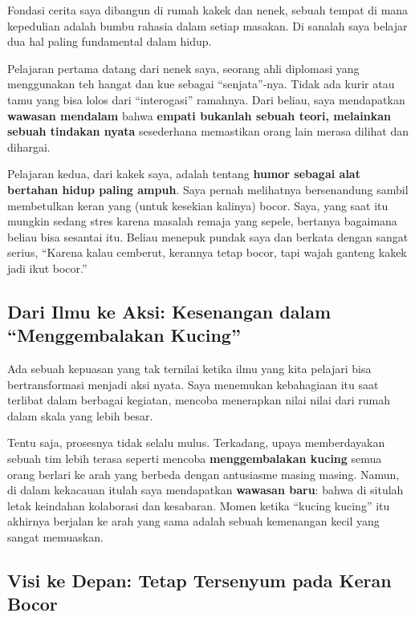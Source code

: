 \documentclass[
  letterpaper,
  DIV=11,
  numbers=noendperiod]{scrreprt}
\begin{document}
Fondasi cerita saya dibangun di rumah kakek dan nenek, sebuah tempat di
mana kepedulian adalah bumbu rahasia dalam setiap masakan. Di sanalah
saya belajar dua hal paling fundamental dalam hidup.

Pelajaran pertama datang dari nenek saya, seorang ahli diplomasi yang
menggunakan teh hangat dan kue sebagai ``senjata''-nya. Tidak ada kurir
atau tamu yang bisa lolos dari ``interogasi'' ramahnya. Dari beliau,
saya mendapatkan \textbf{wawasan mendalam} bahwa \textbf{empati bukanlah
sebuah teori, melainkan sebuah tindakan nyata} sesederhana memastikan
orang lain merasa dilihat dan dihargai.

Pelajaran kedua, dari kakek saya, adalah tentang \textbf{humor sebagai
alat bertahan hidup paling ampuh}. Saya pernah melihatnya bersenandung
sambil membetulkan keran yang (untuk kesekian kalinya) bocor. Saya, yang
saat itu mungkin sedang stres karena masalah remaja yang sepele,
bertanya bagaimana beliau bisa sesantai itu. Beliau menepuk pundak saya
dan berkata dengan sangat serius, ``Karena kalau cemberut, kerannya
tetap bocor, tapi wajah ganteng kakek jadi ikut bocor.''

\subsection{Dari Ilmu ke Aksi: Kesenangan dalam ``Menggembalakan
Kucing''}\label{dari-ilmu-ke-aksi-kesenangan-dalam-menggembalakan-kucing}

Ada sebuah kepuasan yang tak ternilai ketika ilmu yang kita pelajari
bisa bertransformasi menjadi aksi nyata. Saya menemukan kebahagiaan itu
saat terlibat dalam berbagai kegiatan, mencoba menerapkan nilai nilai
dari rumah dalam skala yang lebih besar.

Tentu saja, prosesnya tidak selalu mulus. Terkadang, upaya memberdayakan
sebuah tim lebih terasa seperti mencoba \textbf{menggembalakan kucing}
semua orang berlari ke arah yang berbeda dengan antusiasme masing
masing. Namun, di dalam kekacauan itulah saya mendapatkan
\textbf{wawasan baru}: bahwa di situlah letak keindahan kolaborasi dan
kesabaran. Momen ketika ``kucing kucing'' itu akhirnya berjalan ke arah
yang sama adalah sebuah kemenangan kecil yang sangat memuaskan.

\subsection{Visi ke Depan: Tetap Tersenyum pada Keran
Bocor}\label{visi-ke-depan-tetap-tersenyum-pada-keran-bocor}
\end{document}
